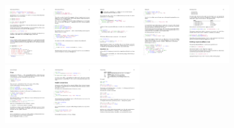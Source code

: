 \begin{figure}
\begin{centering}
\includegraphics[height=2.51cm]{random-pages/random-pages-from-kalinin-pdf-01}\includegraphics[height=2.51cm]{random-pages/random-pages-from-kalinin-pdf-02}\includegraphics[height=2.51cm]{random-pages/random-pages-from-kalinin-pdf-03}\includegraphics[height=2.51cm]{random-pages/random-pages-from-kalinin-pdf-04}\includegraphics[height=2.51cm]{random-pages/random-pages-from-kalinin-pdf-06}\includegraphics[height=2.51cm]{random-pages/random-pages-from-kalinin-pdf-07}\includegraphics[height=2.51cm]{random-pages/random-pages-from-kalinin-pdf-08}\includegraphics[height=2.51cm]{random-pages/random-pages-from-kalinin-pdf-09}
\par\end{centering}
\vspace{-0.6\baselineskip}


\end{figure}
